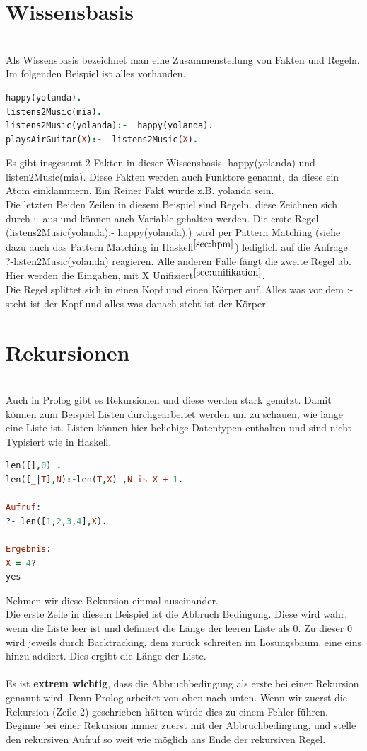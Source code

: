 \section{Wissensbasis}\qquad\\
Als Wissensbasis bezeichnet man eine Zusammenstellung von Fakten und Regeln. Im folgenden Beispiel ist alles vorhanden. 
\begin{lstlisting}[language=Prolog] 
happy(yolanda).
listens2Music(mia).
listens2Music(yolanda):-  happy(yolanda).
playsAirGuitar(X):-  listens2Music(X). 
\end{lstlisting}
Es gibt insgesamt 2 Fakten in dieser Wissensbasis. happy(yolanda) und listen2Music(mia). Diese Fakten werden auch Funktore genannt, da diese ein Atom einklammern. Ein Reiner Fakt würde z.B. yolanda sein. \\
Die letzten Beiden Zeilen in diesem Beispiel sind Regeln. diese Zeichnen sich durch :- aus und können auch Variable gehalten werden. Die erste Regel (listens2Music(yolanda):-  happy(yolanda).) wird per Pattern Matching (siehe dazu auch das Pattern Matching in Haskell$^{\ref{sec:hpm}}$) lediglich auf die Anfrage\\ ?-listen2Music(yolanda) reagieren. Alle anderen Fälle fängt die zweite Regel ab. Hier werden die Eingaben, mit X Unifiziert$^{\ref{sec:unifikation}}$. \\
Die Regel splittet sich in einen Kopf und einen Körper auf. Alles was vor dem :- steht ist der Kopf und alles was danach steht ist der Körper. 
\section{Rekursionen}\qquad\\
Auch in Prolog gibt es Rekursionen und diese werden stark genutzt. Damit können zum Beispiel Listen durchgearbeitet werden um zu schauen, wie lange eine Liste ist. Listen können hier beliebige Datentypen enthalten und sind nicht Typisiert wie in Haskell. 
\begin{lstlisting}[language=Prolog] 
len([],0) .
len([_|T],N):-len(T,X) ,N is X + 1.

Aufruf:
?- len([1,2,3,4],X).

Ergebnis:
X = 4?
yes
\end{lstlisting}
Nehmen wir diese Rekursion einmal auseinander.\\
Die erste Zeile in diesem Beispiel ist die Abbruch Bedingung. Diese wird wahr, wenn die Liste leer ist und definiert die Länge der leeren Liste als 0. Zu dieser 0 wird jeweils durch Backtracking, dem zurück schreiten im Lösungsbaum, eine eins hinzu addiert. Dies ergibt die Länge der Liste. \\
\qquad\\
Es ist \textbf{extrem wichtig}, dass die Abbruchbedingung als erste bei einer Rekursion genannt wird. Denn Prolog arbeitet von oben nach unten. Wenn wir zuerst die Rekursion (Zeile 2) geschrieben hätten würde dies zu einem Fehler führen. \\
Beginne bei einer Rekursion immer zuerst mit der Abbruchbedingung, und stelle den rekursiven Aufruf so weit wie möglich ans Ende der rekursiven Regel.
